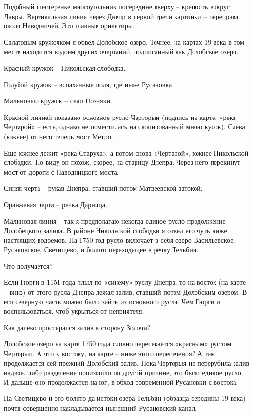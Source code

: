 Подобный шестеренке многоугольник посередине вверху – крепость вокруг Лавры. Вертикальная линия через Днепр в первой трети картинки – переправа около Наводничей. Это главные ориентиры.

Салатовым кружочком я обвел Долобское озеро. Точнее, на картах 19 века в том месте находится водоем других очертаний, подписанный как Долобское озеро.

Красный кружок – Никольская слободка.

Голубой кружок – вспаханные поля, где ныне Русановка.

Малиновый кружок – село Позняки.

Красной линией показано основное русло Черторыи (подпись на карте, «река Чертарой» – есть, однако не поместилась на скопированный мною кусок). Слева (южнее) от него теперь мост Метро. 

Еще южнее лежит «река Старуха», а потом снова «Чертарой», южнее Никольской слободки. По виду он похож, скорее, на старицу Днепра. Через него перекинут мост от дороги с Наводницкого моста. 

Синяя черта – рукав Днепра, ставший потом Матвеевской затокой.

Оранжевая черта – речка Дарница.

Малиновая линия – так я предполагаю некогда единое русло-продолжение Долобецкого залива. В районе Никольской слободки я отвел его чуть ниже настоящих водоемов. На 1750 год русло включает в себя озеро Васильевское, Русановское, Светищево, и болото переходящее в речку Тельбин.
 
Что получается? 

Если Гюрги в 1151 года плыл по «синему» руслу Днепра, то на восток (на карте – вниз) от этого русла Днепра лежал залив, ставший потом Долобским озером. В его северную часть можно было зайти из основного русла. Чем Гюрги и воспользоваться, чтоб укрыться от неприятеля.

Как далеко простирался залив в сторону Золочи?

Долобское озеро на карте 1750 года словно пересекается «красным» руслом Черторыи. А что к востоку, на карте – ниже этого пересечения? А там продолжается сей прежний Долобский залив. Пока Черторыя не перерубила залив надвое, либо разделение произошло по другой причине, это было единое русло. И дальше оно продолжается на юг, в обход современной Русановки с востока. 

На Светищево и это болото да истоки озера Тельбин (образца середины 19 века) почти совершенно накладывается нынешний Русановский канал.

